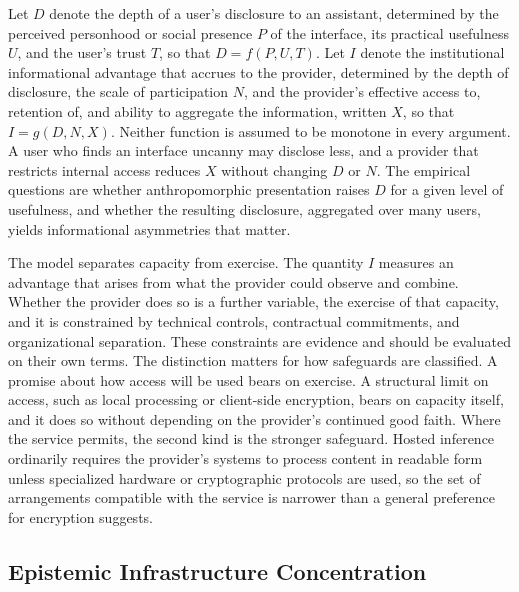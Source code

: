 \documentclass[12pt]{article}
\theoremstyle{definition}
\theoremstyle{remark}
\begin{document}
Let $D$ denote the depth of a user's disclosure to an assistant, determined by the perceived personhood or social presence $P$ of the interface, its practical usefulness $U$, and the user's trust $T$, so that $D=f(P,U,T)$. Let $I$ denote the institutional informational advantage that accrues to the provider, determined by the depth of disclosure, the scale of participation $N$, and the provider's effective access to, retention of, and ability to aggregate the information, written $X$, so that $I=g(D,N,X)$. Neither function is assumed to be monotone in every argument. A user who finds an interface uncanny may disclose less, and a provider that restricts internal access reduces $X$ without changing $D$ or $N$. The empirical questions are whether anthropomorphic presentation raises $D$ for a given level of usefulness, and whether the resulting disclosure, aggregated over many users, yields informational asymmetries that matter.

The model separates capacity from exercise. The quantity $I$ measures an advantage that arises from what the provider could observe and combine. Whether the provider does so is a further variable, the exercise of that capacity, and it is constrained by technical controls, contractual commitments, and organizational separation. These constraints are evidence and should be evaluated on their own terms. The distinction matters for how safeguards are classified. A promise about how access will be used bears on exercise. A structural limit on access, such as local processing or client-side encryption, bears on capacity itself, and it does so without depending on the provider's continued good faith. Where the service permits, the second kind is the stronger safeguard. Hosted inference ordinarily requires the provider's systems to process content in readable form unless specialized hardware or cryptographic protocols are used, so the set of arrangements compatible with the service is narrower than a general preference for encryption suggests.

\subsection{Epistemic Infrastructure Concentration}
\end{document}
